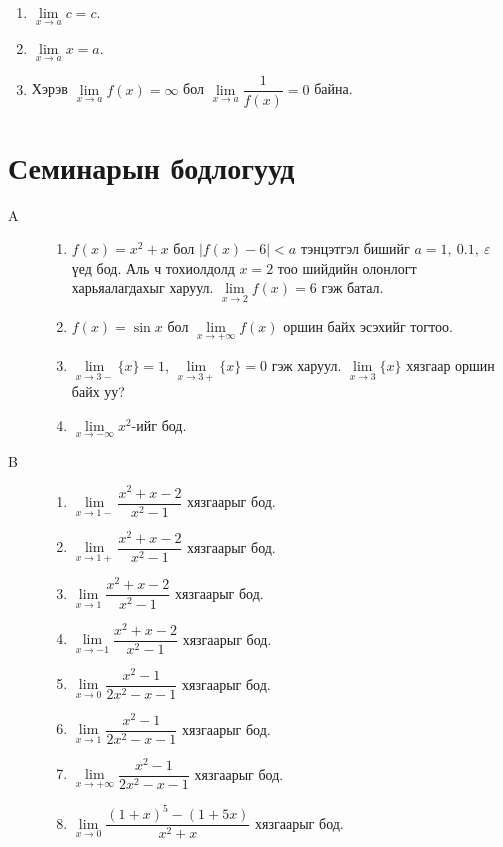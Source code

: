 \begin{theorem}\label{conslim}
\begin{enumerate}
\item $\lim\limits_{x\to a}c=c$.
\item $\lim\limits_{x\to a}x=a$.
\item Хэрэв $\lim\limits_{x\to a}f(x)=\infty$ бол $\lim\limits_{x\to a}\dfrac{1}{f(x)}=0$ байна.
\end{enumerate}
\end{theorem}

\section*{Семинарын бодлогууд}
\begin{description}
\item[A] \begin{enumerate}
    \item $f(x)=x^2+x$ бол $|f(x)-6|<a$ тэнцэтгэл бишийг $a=1,\ 0.1,\ \varepsilon$ үед бод. Аль ч тохиолдолд $x=2$ тоо шийдийн олонлогт харьяалагдахыг харуул.
    $\lim\limits_{x\to 2}f(x)=6$ гэж батал.
    \item $f(x)=\sin x$ бол $\lim\limits_{x\to +\infty}f(x)$ оршин байх эсэхийг тогтоо.
    \item $\lim\limits_{x\to 3-}\{x\}=1$, $\lim\limits_{x\to 3+}\{x\}=0$ гэж харуул. $\lim\limits_{x\to 3}\{x\}$ хязгаар оршин байх уу?
    \item $\lim\limits_{x\to -\infty}x^2$-ийг бод.
\end{enumerate}
\item[B]
\begin{enumerate}
\item $\lim\limits _{x\to 1-}\dfrac{x^2+x-2}{x^2-1}$ хязгаарыг бод.
\item $\lim\limits _{x\to 1+}\dfrac{x^2+x-2}{x^2-1}$ хязгаарыг бод.
\item $\lim\limits _{x\to 1}\dfrac{x^2+x-2}{x^2-1}$ хязгаарыг бод.
\item $\lim\limits _{x\to -1}\dfrac{x^2+x-2}{x^2-1}$ хязгаарыг бод.
\item $\lim\limits _{x\to 0} \dfrac{x^2-1}{2x^2-x-1}$ хязгаарыг бод.
\item $\lim\limits _{x\to 1} \dfrac{x^2-1}{2x^2-x-1}$ хязгаарыг бод.
\item $\lim\limits _{x\to +\infty} \dfrac{x^2-1}{2x^2-x-1}$ хязгаарыг бод.
\item $\lim\limits _{x\to 0} \dfrac{(1+x)^5-(1+5x)}{x^2+x}$ хязгаарыг бод.

\end{enumerate}
\end{description}
